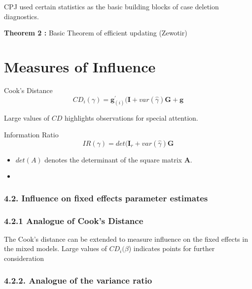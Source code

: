 \documentclass[12pt, a4paper]{article}
\begin{document}
CPJ used certain statistics as the basic building blocks of case deletion diagnostics.



\textbf{Theorem 2 :} Basic Theorem of efficient updating (Zewotir)

\section{Measures of Influence}

Cook's Distance
\[  CD_{i}(\gamma) = \boldsymbol{g}^{\prime}_{(i)} ( \boldsymbol{I} + var(\hat{\gamma}) \boldsymbol{G} + \boldsymbol{g}\]

Large values of $CD$ highlights observations for special attention.

Information Ratio
\[ IR(\gamma) = det( \boldsymbol{I}_r + var(\hat{\gamma})\boldsymbol{G} \]

\begin{itemize}
\item $det(A)$ denotes the determinant of the square matrix $\boldsymbol{A}$.
\item
\end{itemize}

\subsubsection*{4.2. Influence on fixed effects parameter estimates}
\subsubsection*{4.2.1 Analogue of Cook’s Distance}
The Cook’s distance can be extended to measure influence on the fixed effects in the mixed models.
Large values of $CD_i(\beta$) indicates points for further consideration
\subsubsection*{4.2.2. Analogue of the variance ratio}
\end{document}
